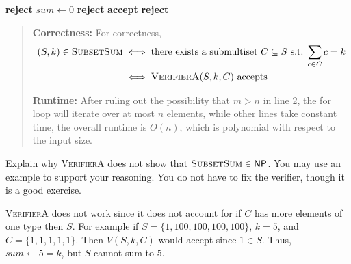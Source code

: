 \documentclass[12pt, letterpaper]{article}
\newcommand{\NP}{\mathsf{NP}}
\begin{document}
\begin{subproblem}{}
    \begin{center}
      \begin{minipage}{0.9\linewidth}
        \begin{algorithm}[H]
       \begin{algorithmic}[1]
          \textbf{reject}  \EndIf 
         \State $sum \gets 0$
          
          \textbf{reject} 
         \EndIf
         \EndFor
          \textbf{accept} \EndIf
         \State \textbf{reject}
         \EndFunction
       \end{algorithmic}
     \end{algorithm}  
     \end{minipage}
     \end{center}
    \begin{quote}
        \textbf{Correctness:} For correctness,
        \begin{align*}
            (S,k) \in \textsc{SubsetSum} &\iff \text{there exists a submultiset $C \subseteq S$ s.t. $\sum_{c \in C} c = k$} \\
            & \iff \textsc{VerifierA}(S,k,C) \text{ accepts}
        \end{align*}
      
        \textbf{Runtime:} After ruling out the possibility that $m > n$ in line 2, the for loop will iterate over at most $n$ elements, while other lines take constant time, the overall runtime is $O(n)$, which is polynomial with respect to the input size. 
    \end{quote}

    Explain why \textsc{VerifierA} does not show that $\SubsetSum \in \NP$. You may use an example to support your reasoning. You do not have to fix the verifier, though it is a good exercise. 
\end{subproblem}
\vspace{10pt}
\begin{problemproof}
    \textsc{VerifierA} does not work since it does not account for if $C$ has more elements of one type then $S$. For example if $S=\{1,100,100,100,100\}$, $k=5$, and $C=\{1,1,1,1,1\}$. Then $V(S,k,C)$ would accept since $1 \in S$. Thus, $sum \leftarrow 5=k$, but $S$ cannot sum to $5$.
\end{problemproof}
\end{document}
